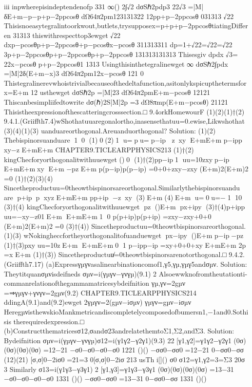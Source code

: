 {{{{{{{{{{{iii
inpwherepisindeptendenofp
331
∞()
2∫√2
dσSℏ2pdp3
22√3
=|M|δE+m−p−p+p−2ppcosθ
dΩ64π2pm123131322
12pp+p−2ppcosθ
031313
√22
Thisisnoeasytegralintoorkwout,butlets,trysupposex=p+p+p−2ppcosθtiatingDifferen
31313
thiswithrespecttop3ewget
√22
dxp−pcosθp+p−2ppcosθ+p−pcosθx−pcosθ
311313311
dp=1+√22=√22=√22
3p+p−2ppcosθp+p−2ppcosθp+p−2ppcosθ
131313131313
Thisesgiv
dpdx
√3=
22x−pcosθ
p+p−2ppcosθ1
1313
Usingthisinthetegralinewget
∞
dσSℏ2∫pdx
=|M|2δ(E+m−x)3
dΩ64π2pm12x−pcosθ
121
0
Thistegralinerevwhoistrivialbecauseofthedeltafunction,asitonlykspicupthetermsforx=E+m
12
usthewget
dσSℏ2p
=|M|23
dΩ64π2pmE+m−pcosθ
12121
Thiscanbesimpliifedtowrite
dσ(ℏ)2S|M|2p
=3
dΩ8πmp(E+m−pcosθ)
21121
Thisistheexpressionofthescatteringcrosssection.□
9.4orkHomewourF
(1)(2)(1)†(2)
9.4.1.(Griiffth7.4)wShothatuuaregonalortho,inasensethatuu=0.ewise,Likwshothat
(3)(4)(1)(3)
uanduareorthogonal.Areuanduorthogonal?
Solution:
(1)(2)
Thebispinorsuanduare
10
(1)0(2)1
u=pu=p−ip
zxy
E+mE+m
p−ipp
xy−z
E+mE+m
CHAPTER9.TICLEARPPHYSICS213
(1)†(2)
kingChecforyorthogonalitwithuuewget
()0
(1)†(2)pp−ip1
uu=10zxyp−ip
E+mE+mxy
E+m
−pz
E+m
p(p−ip)p(p−ip)
=0+0+zxy−zxy
(E+m)2(E+m)2
=0
(1)†(2)(3)(4)
Sincetheproductuu=0theowtbispinorsareorthogonal.Similarlythebispinorsuandu
are
p+ipp
xyz
E+mE+m
pp+ip
−zxy
(3)E+m(4)E+m
u=0u=−1
10
(3)†(4)
kingChecforyorthogonalitwithuuewget
pz
()E+m
px+ipy
(3)†(4)p+ipp
uu=−xy−z01E+m
E+mE+m1
0
p(p+ip)p(p+ip)
=zxy−zxy+0+0
(E+m)2(E+m)2
=0
(3)†(4))
Sincetheproductuu=0theowtbispinorsareorthogonal.
(1)(3)
wNokingheccfortheyorthogonalitofuanduewget
px−ipy
()E+m
p−ip−pz
(1)†(3)pxy
uu=10zE+m
E+mE+m0
1
p−ipp−ip
=xy+0+0+xy
E+mE+m
2p
=x
E+m
(1)†(3))
Sincetheproductuu̸=0theowtbispinorsarenotorthogonal.□
9.4.2.(Griiffth7.17)
(a)Expressγµγνasalinearbinationcomof1,γ5,γµ,γµγ5andσµν.
Solution:
Theytitquanσµνisdeifneds
σµν=i(γµγν−γνγµ)(9.1)
2
Alsoewwknofromtheutationti-commanrelationofthegammamatricesybdeifnition
{γµ,γν}=2gµν
=⇒γµγν+γνγν=2gµν(9.2)
CHAPTER9.TICLEARPPHYSICS214
ddingA(9.1)and(9.2)ewget
2γµγν=2(gµν−iσµν)
γµγν=gµν−iσµν
HeregµνisthewskioMankmetricandiscompletelycomposedofbumersn1,−1and0.Sothisis
therequiredexpression.□
(b)Constructthematricesσ12,σandσ23andrelatethemtoΣ1,Σ2,andΣ3.
Solution:
Bydeifnition
σµν=i(γµγν−γνγµ)σ12=i(γ1γ2−γ2γ1)(9.3)
22
[γ1,γ2]=γ1γ2−γ2γ1
(0σ)(0σ)(0σ)(0σ)
=12−21
−σ0−σ0−σ0−σ0
1221
()()
−σσ0−σσ0
=12−21
0−σσ0−σσ
(12)(21)
[σ,σ]0−2iσ0
=21=3
0[σ,σ]0−2iσ
213
usTh
i[]()
σ0
σ12=γ1,γ2=3=Σ3
20σ
3
Similarly
σ13=i(γ1γ3−γ3γ1)
2
[γ1,γ3]=γ1γ3−γ3γ1
(0σ)(0σ)(0σ)(0σ)
=13−31
−σ0−σ0−σ0−σ0
1331
()()
−σσ0−σσ0
=13−31
0−σσ0−σσ
1331
()()
}}}}}}}}}}}
